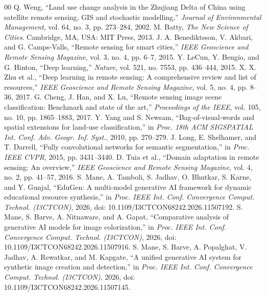 \documentclass[conference]{IEEEtran}
\begin{document}
\FloatBarrier
\begin{thebibliography}{00}
 Q. Weng, ``Land use change analysis in the Zhujiang Delta of China using satellite remote sensing, GIS and stochastic modelling,'' \textit{Journal of Environmental Management}, vol. 64, no. 3, pp. 273--284, 2002.
 M. Batty, \textit{The New Science of Cities}. Cambridge, MA, USA: MIT Press, 2013.
 J. A. Benediktsson, V. Akbari, and G. Camps-Valls, ``Remote sensing for smart cities,'' \textit{IEEE Geoscience and Remote Sensing Magazine}, vol. 3, no. 4, pp. 6--7, 2015.
 Y. LeCun, Y. Bengio, and G. Hinton, ``Deep learning,'' \textit{Nature}, vol. 521, no. 7553, pp. 436--444, 2015.
 X. X. Zhu et al., ``Deep learning in remote sensing: A comprehensive review and list of resources,'' \textit{IEEE Geoscience and Remote Sensing Magazine}, vol. 5, no. 4, pp. 8--36, 2017.
 G. Cheng, J. Han, and X. Lu, ``Remote sensing image scene classification: Benchmark and state of the art,'' \textit{Proceedings of the IEEE}, vol. 105, no. 10, pp. 1865--1883, 2017.
 Y. Yang and S. Newsam, ``Bag-of-visual-words and spatial extensions for land-use classification,'' in \textit{Proc. 18th ACM SIGSPATIAL Int. Conf. Adv. Geogr. Inf. Syst.}, 2010, pp. 270--279.
 J. Long, E. Shelhamer, and T. Darrell, ``Fully convolutional networks for semantic segmentation,'' in \textit{Proc. IEEE CVPR}, 2015, pp. 3431--3440.
 D. Tuia et al., ``Domain adaptation in remote sensing: An overview,'' \textit{IEEE Geoscience and Remote Sensing Magazine}, vol. 4, no. 2, pp. 41--57, 2016.
 S. Mane, A. Tamboli, S. Jadhav, O. Bhutkar, S. Karne, and Y. Gunjal, ``EduGen: A multi-model generative AI framework for dynamic educational resource synthesis,'' in \textit{Proc. IEEE Int. Conf. Convergence Comput. Technol. (I3CTCON)}, 2026, doi: 10.1109/I3CTCON68242.2026.11507192.
 S. Mane, S. Barve, A. Nitnaware, and A. Gapat, ``Comparative analysis of generative AI models for image colorization,'' in \textit{Proc. IEEE Int. Conf. Convergence Comput. Technol. (I3CTCON)}, 2026, doi: 10.1109/I3CTCON68242.2026.11507916.
 S. Mane, S. Barve, A. Popalghat, V. Jadhav, A. Rewatkar, and M. Kapgate, ``A unified generative AI system for synthetic image creation and detection,'' in \textit{Proc. IEEE Int. Conf. Convergence Comput. Technol. (I3CTCON)}, 2026, doi: 10.1109/I3CTCON68242.2026.11507145.

\end{thebibliography}
\end{document}
